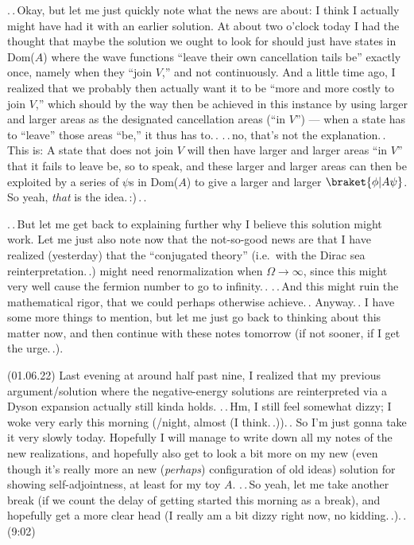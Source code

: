 \documentclass{report}
\begin{document}
.\,.\,Okay, but let me just quickly note what the news are about: I think I actually might have had it with an earlier solution. At about two o'clock today I had the thought that maybe the solution we ought to look for should just have states in Dom($A$) where the wave functions ``leave their own cancellation tails be'' exactly once, namely when they ``join $V$,'' and not continuously. And a little time ago, I realized that we probably then actually want it to be ``more and more costly to join $V$,'' which should by the way then be achieved in this instance by using larger and larger areas as the designated cancellation areas (``in $V$'') --- when a state has to ``leave'' those areas ``be,'' it thus has to.\,. .\,.\,no, that's not the explanation.\,. This is: A state that does not join $V$ will then have larger and larger areas ``in $V$'' that it fails to leave be, so to speak, and these larger and larger areas can then be exploited by a series of $\psi$s in Dom($A$) to give a larger and larger $\braket{\phi | A \psi}$. So yeah, \emph{that} is the idea.\,:)\,.\,. %

.\,.\,But let me get back to explaining further why I believe this solution might work. Let me just also note now that the not-so-good news are that I have realized (yesterday) that the ``conjugated theory'' (i.e.\ with the Dirac sea reinterpretation.\,.) might need renormalization when $\Omega\to\infty$, since this might very well cause the fermion number to go to infinity.\,. .\,.\,And this might ruin the mathematical rigor, that we could perhaps otherwise achieve.\,. Anyway.\,. I have some more things to mention, but let me just go back to thinking about this matter now, and then continue with these notes tomorrow (if not sooner, if I get the urge.\,.). 

(01.06.22) Last evening at around half past nine, I realized that my previous argument/solution where the negative-energy solutions are reinterpreted via a Dyson expansion actually still kinda holds. .\,.\,Hm, I still feel somewhat dizzy; I woke very early this morning (/night, almost (I think.\,.)).\,. So I'm just gonna take it very slowly today. Hopefully I will manage to write down all my notes of the new realizations, and hopefully also get to look a bit more on my new (even though it's really more an new (\emph{perhaps}) configuration of old ideas) solution for showing self-adjointness, at least for my toy $A$. .\,.\,So yeah, let me take another break (if we count the delay of getting started this morning as a break), and hopefully get a more clear head (I really am a bit dizzy right now, no kidding.\,.).\,. (9:02) 
\end{document}
